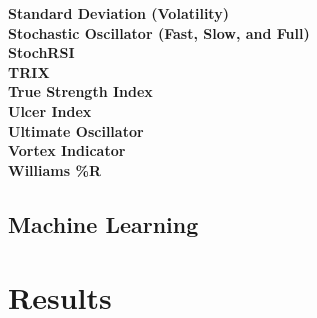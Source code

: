 \documentclass[12pt,a4paper]{article}
\begin{document}
\iffalse
[]
\fi

\textbf{Standard Deviation (Volatility)} \\

\iffalse
[]
\fi

\textbf{Stochastic Oscillator (Fast, Slow, and Full)} \\

\iffalse
[]
\fi

\textbf{StochRSI} \\

\iffalse
[]
\fi

\textbf{TRIX} \\

\iffalse
[]
\fi

\textbf{True Strength Index} \\

\iffalse
[]
\fi

\textbf{Ulcer Index} \\

\iffalse
[]
\fi

\textbf{Ultimate Oscillator} \\

\iffalse
[]
\fi

\textbf{Vortex Indicator} \\

\iffalse
[]
\fi

\textbf{Williams \%R} \\

\iffalse
[]
\fi

\iffalse
#################################################################################
\fi

\subsection*{Machine Learning}



\iffalse
#################################################################################
\fi

\section{Results}

\iffalse
this section presents the results of the solutions.  It should include information on experimental settings.  The results should demonstrate the claimed benefits/disadvantages of the proposed solutions.
This section should be between 2 to 3 pages in length.
\fi
\end{document}
